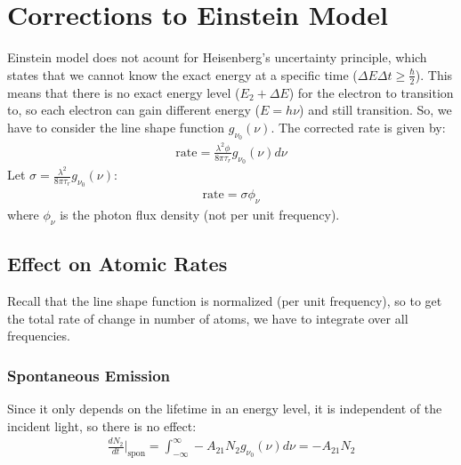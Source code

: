 \documentclass[11pt]{article}
\begin{document}
\section{Corrections to Einstein Model}
Einstein model does not acount for Heisenberg's uncertainty principle, which states that we cannot know the exact energy at a specific time ($\Delta E \Delta t \geq \frac{\hbar}{2}$). This means that there is no exact energy level ($E_2 + \Delta E$) for the electron to transition to, so each electron can gain different energy ($E=h \nu$) and still transition. So, we have to consider the line shape function $g_{\nu_0}(\nu)$. The corrected rate is given by:
\begin{align*}
    \text{rate} = \frac{\lambda^2 \phi}{8 \pi \tau_r} g_{\nu_0}(\nu) d\nu
\end{align*}
Let $\sigma = \frac{\lambda^2}{8 \pi \tau_r} g_{\nu_0}(\nu)$:
\begin{align*}
    \text{rate} = \sigma \phi_{\nu} 
\end{align*}
where $\phi_{\nu}$ is the photon flux density (not per unit frequency).
\subsection{Effect on Atomic Rates}
Recall that the line shape function is normalized (per unit frequency), so to get the total rate of change in number of atoms, we have to integrate over all frequencies.
\subsubsection{Spontaneous Emission}
Since it only depends on the lifetime in an energy level, it is independent of the incident light, so there is no effect:
\begin{align*}
    \frac{dN_2}{dt} \bigg|_{\text{spon}} = \int_{-\infty}^{\infty} -A_{21} N_2 g_{\nu_0}(\nu) d\nu = -A_{21} N_2
\end{align*}
\end{document}

